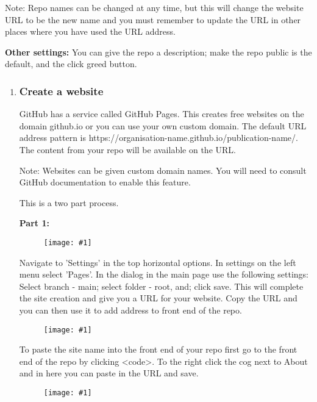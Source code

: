 \documentclass{article}
\newlength{\imgwidth}
\newcommand\scaledgraphics[2]{%
                
\settowidth{\imgwidth}{\texttt{[image: \#1]}}%
                
\setlength{\imgwidth}{\minof{\imgwidth}{#2\textwidth}}%
                
\texttt{[image: \#1]}%
                
}
\begin{document}
Note: Repo names can be changed at any time, but this will change the website URL to be the new name and you must remember to update the URL in other places where you have used the URL address.


\textbf{Other settings:} You can give the repo a description; make the repo public is the default, and the click greed button.

\begin{enumerate}
\item 


\subsubsection{Create a website}\label{H9225084}



GitHub has a service called GitHub Pages. This creates free websites on the domain github.io or you can use your own custom domain. The default URL address pattern is https://organisation-name.github.io/publication-name/. The content from your repo will be available on the URL. 


Note: Websites can be given custom domain names. You will need to consult GitHub documentation to enable this feature.


This is a two part process.


\textbf{Part 1:}

\begin{figure}
\scaledgraphics{cd4aad9d-5d95-4ecd-944d-f1f6ce8e75f3.png}{1}
\label{F72332451}
\end{figure}


Navigate to 'Settings' in the top horizontal options. In settings on the left menu select 'Pages'. In the dialog in the main page use the following settings: Select branch - main; select folder - root, and; click save. This will complete the site creation and give you a URL for your website. Copy the URL and you can then use it to add address to front end of the repo.

\begin{figure}
\scaledgraphics{d941d969-3938-4dec-aa57-a45debb46e84.png}{1}
\label{F78400191}
\end{figure}


To paste the site name into the front end of your repo first go to the front end of the repo by clicking <code>. To the right click the cog next to About and in here you can paste in the URL and save.

\begin{figure}
\scaledgraphics{7b251363-3e8f-4da0-9185-bb245e4aaa97.png}{1}
\label{F80239021}
\end{figure}



\end{enumerate}
\end{document}
